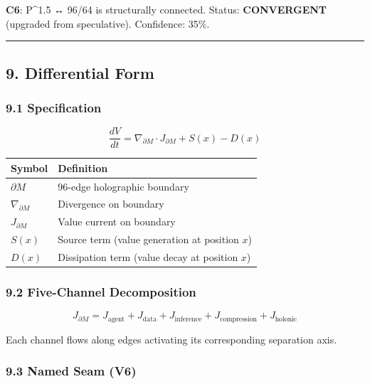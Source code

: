 \documentclass[
  11pt,
]{article}
\newcounter{none} %
\begin{document}
\textbf{C6}: P\^{}1.5 ↔ 96/64 is structurally connected. Status:
\textbf{CONVERGENT} (upgraded from speculative). Confidence: 35\%.

\begin{center}\rule{0.5\linewidth}{0.5pt}\end{center}

\subsection{9. Differential Form}\label{differential-form-1}

\subsubsection{9.1 Specification}\label{specification}

\[\frac{dV}{dt} = \nabla_{\partial M} \cdot J_{\partial M} + S(x) - D(x)\]

{\def\LTcaptype{none} %
\begin{longtable}[]{@{}ll@{}}
\toprule\noalign{}
Symbol & Definition \\
\midrule\noalign{}
\endhead
\bottomrule\noalign{}
\endlastfoot
\(\partial M\) & 96-edge holographic boundary \\
\(\nabla_{\partial M}\) & Divergence on boundary \\
\(J_{\partial M}\) & Value current on boundary \\
\(S(x)\) & Source term (value generation at position \(x\)) \\
\(D(x)\) & Dissipation term (value decay at position \(x\)) \\
\end{longtable}
}

\subsubsection{9.2 Five-Channel
Decomposition}\label{five-channel-decomposition}

\[J_{\partial M} = J_{\text{agent}} + J_{\text{data}} + J_{\text{inference}} + J_{\text{compression}} + J_{\text{holonic}}\]

Each channel flows along edges activating its corresponding separation
axis.

\subsubsection{9.3 Named Seam (V6)}\label{named-seam-v6}
\end{document}
